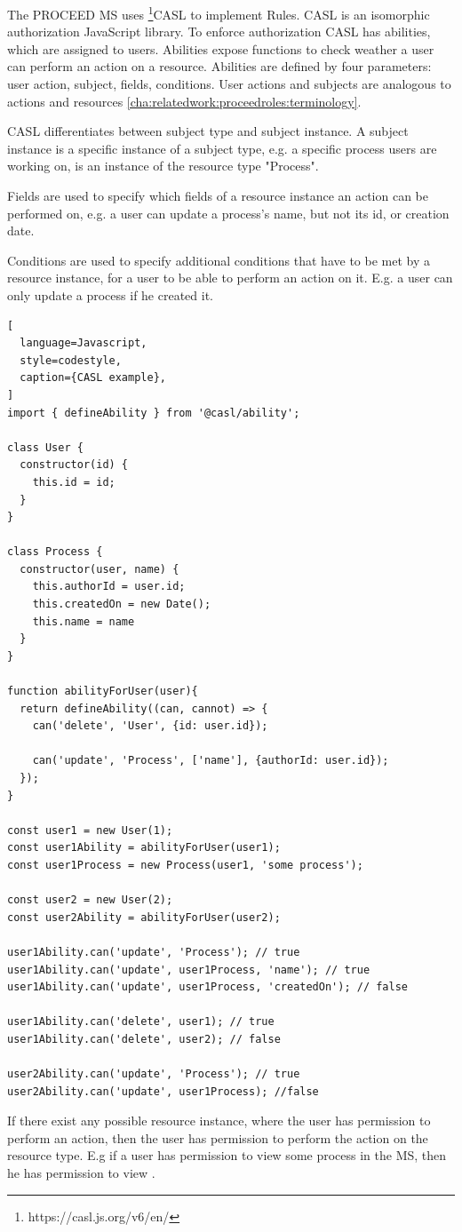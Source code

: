 The PROCEED MS uses \footnote{https://casl.js.org/v6/en/}{CASL} to implement Rules. CASL
is an isomorphic authorization JavaScript library.
To enforce authorization CASL has abilities, which are assigned to users.
Abilities expose functions to check weather a user can perform an action on a resource.
Abilities are defined by four parameters: user action, subject, fields, conditions.
User actions and subjects are analogous to actions and resources \ref{cha:relatedwork:proceedroles:terminology}.

CASL differentiates between subject type and subject instance. 
A subject instance is a specific instance of a subject type, e.g. a specific process
users are working on, is an instance of the resource type "Process". 

Fields are used to specify which fields of a resource instance an action can be performed
on, e.g. a user can update a process's name, but not its id, or creation date.

Conditions are used to specify additional conditions that have to be met by a resource
instance, for a user to be able to perform an action on it. E.g. a user can only update a
process if he created it.

\begin{lstlisting}[
  language=Javascript,
  style=codestyle,
  caption={CASL example},
]
import { defineAbility } from '@casl/ability';

class User {
  constructor(id) {
    this.id = id;
  }
}

class Process {
  constructor(user, name) {
    this.authorId = user.id;
    this.createdOn = new Date();
    this.name = name
  }
}

function abilityForUser(user){
  return defineAbility((can, cannot) => {
    can('delete', 'User', {id: user.id});

    can('update', 'Process', ['name'], {authorId: user.id});
  });
}

const user1 = new User(1);
const user1Ability = abilityForUser(user1);
const user1Process = new Process(user1, 'some process');

const user2 = new User(2);
const user2Ability = abilityForUser(user2);

user1Ability.can('update', 'Process'); // true
user1Ability.can('update', user1Process, 'name'); // true
user1Ability.can('update', user1Process, 'createdOn'); // false

user1Ability.can('delete', user1); // true
user1Ability.can('delete', user2); // false

user2Ability.can('update', 'Process'); // true
user2Ability.can('update', user1Process); //false
\end{lstlisting}

If there exist any possible resource instance, where the user has permission to perform an action,
then the user has permission to perform the action on the resource type.
E.g if a user has permission to view some process in the MS, then he has permission to view .
